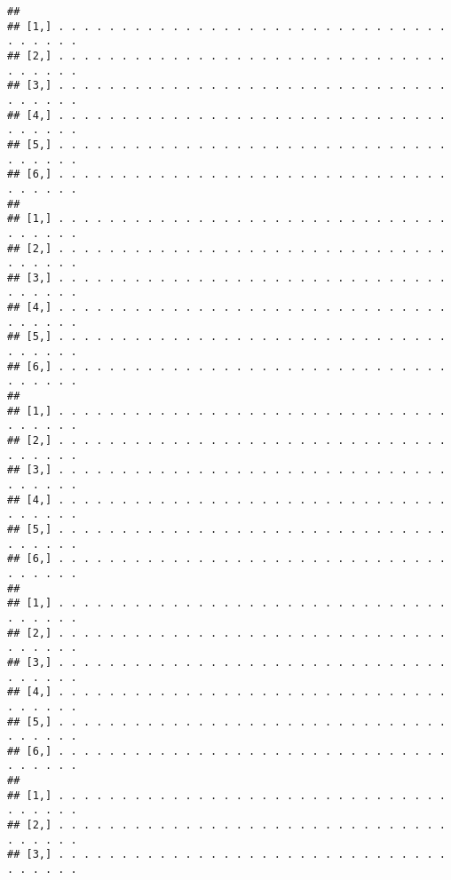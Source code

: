 \documentclass[
]{book}
\begin{document}
\begin{verbatim}
##                                                                               
## [1,] . . . . . . . . . . . . . . . . . . . . . . . . . . . . . . . . . . . . .
## [2,] . . . . . . . . . . . . . . . . . . . . . . . . . . . . . . . . . . . . .
## [3,] . . . . . . . . . . . . . . . . . . . . . . . . . . . . . . . . . . . . .
## [4,] . . . . . . . . . . . . . . . . . . . . . . . . . . . . . . . . . . . . .
## [5,] . . . . . . . . . . . . . . . . . . . . . . . . . . . . . . . . . . . . .
## [6,] . . . . . . . . . . . . . . . . . . . . . . . . . . . . . . . . . . . . .
##                                                                               
## [1,] . . . . . . . . . . . . . . . . . . . . . . . . . . . . . . . . . . . . .
## [2,] . . . . . . . . . . . . . . . . . . . . . . . . . . . . . . . . . . . . .
## [3,] . . . . . . . . . . . . . . . . . . . . . . . . . . . . . . . . . . . . .
## [4,] . . . . . . . . . . . . . . . . . . . . . . . . . . . . . . . . . . . . .
## [5,] . . . . . . . . . . . . . . . . . . . . . . . . . . . . . . . . . . . . .
## [6,] . . . . . . . . . . . . . . . . . . . . . . . . . . . . . . . . . . . . .
##                                                                               
## [1,] . . . . . . . . . . . . . . . . . . . . . . . . . . . . . . . . . . . . .
## [2,] . . . . . . . . . . . . . . . . . . . . . . . . . . . . . . . . . . . . .
## [3,] . . . . . . . . . . . . . . . . . . . . . . . . . . . . . . . . . . . . .
## [4,] . . . . . . . . . . . . . . . . . . . . . . . . . . . . . . . . . . . . .
## [5,] . . . . . . . . . . . . . . . . . . . . . . . . . . . . . . . . . . . . .
## [6,] . . . . . . . . . . . . . . . . . . . . . . . . . . . . . . . . . . . . .
##                                                                               
## [1,] . . . . . . . . . . . . . . . . . . . . . . . . . . . . . . . . . . . . .
## [2,] . . . . . . . . . . . . . . . . . . . . . . . . . . . . . . . . . . . . .
## [3,] . . . . . . . . . . . . . . . . . . . . . . . . . . . . . . . . . . . . .
## [4,] . . . . . . . . . . . . . . . . . . . . . . . . . . . . . . . . . . . . .
## [5,] . . . . . . . . . . . . . . . . . . . . . . . . . . . . . . . . . . . . .
## [6,] . . . . . . . . . . . . . . . . . . . . . . . . . . . . . . . . . . . . .
##                                                                               
## [1,] . . . . . . . . . . . . . . . . . . . . . . . . . . . . . . . . . . . . .
## [2,] . . . . . . . . . . . . . . . . . . . . . . . . . . . . . . . . . . . . .
## [3,] . . . . . . . . . . . . . . . . . . . . . . . . . . . . . . . . . . . . .

\end{verbatim}
\end{document}
